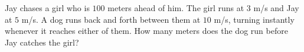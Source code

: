 Jay chases a girl who is $100$ meters ahead of him. The girl runs at $3$ m/s and Jay at $5$ m/s. A dog runs back and forth between them at $10$ m/s, turning instantly whenever it reaches either of them. How many meters does the dog run before Jay catches the girl?
